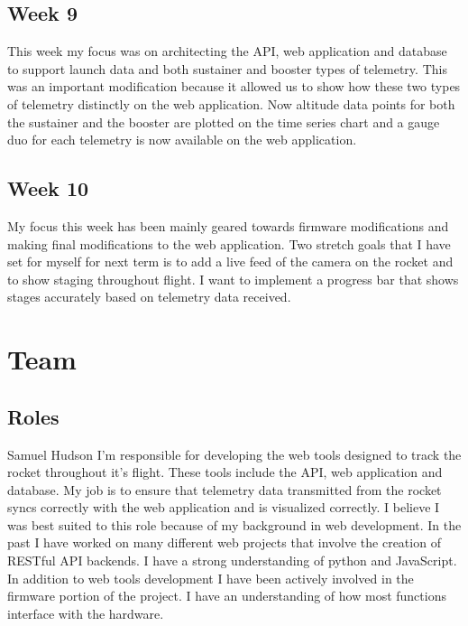 \documentclass[onecolumn, draftclsnofoot,10pt, compsoc]{IEEEtran}
\begin{document}
\subsection{Week 9}
This week my focus was on architecting the API, web application and database to support launch data and both sustainer and booster types of telemetry. This was an important modification because it allowed us to show how these two types of telemetry distinctly on the web application. Now altitude data points for both the sustainer and the booster are plotted on the time series chart and a gauge duo for each telemetry is now available on the web application.
\subsection{Week 10}
My focus this week has been mainly geared towards firmware modifications and making final modifications to the web application. Two stretch goals that I have set for myself for next term is to add a live feed of the camera on the rocket and to show staging throughout flight. I want to implement a progress bar that shows stages accurately based on telemetry data received. 


\section{Team}
\subsection{Roles}

Samuel Hudson 
I'm responsible for developing the web tools designed to track the rocket throughout it's flight. These tools include the API, web application and database. My job is to ensure that telemetry data transmitted from the rocket syncs correctly with the web application and is visualized correctly. I believe I was best suited to this role because of my background in web development. In the past I have worked on many different web projects that involve the creation of RESTful API backends. I have a strong understanding of python and JavaScript. In addition to web tools development I have been actively involved in the firmware portion of the project. I have an understanding of how most functions interface with the hardware.
\end{document}
